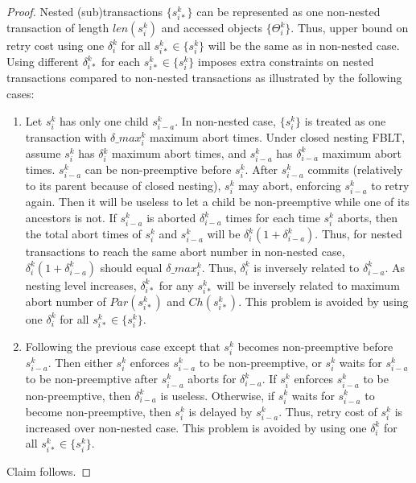 \documentclass[10pt, conference, compsocconf]{IEEEtran}
\begin{document}
\begin{proof}

Nested (sub)transactions $\{s_{i*}^{k}\}$ can be represented as one
non-nested transaction of length $len(s_{i}^{k})$ and accessed objects
$\{\Theta_{i}^{k}\}$. Thus, upper bound on retry cost using one $\delta_{i}^{k}$
for all $s_{i*}^{k}\in\{s_{i}^{k}\}$ will be the same as in non-nested
case. Using different $\delta_{i*}^{k}$ for each $s_{i*}^{k}\in\{s_{i}^{k}\}$
imposes extra constraints on nested transactions compared to non-nested
transactions as illustrated by the following cases:
\begin{enumerate}
\item Let $s_{i}^{k}$ has only one child $s_{i-a}^{k}$. In non-nested
case, $\{s_{i}^{k}\}$ is treated as one transaction with $\delta\_max_{i}^{k}$
maximum abort times. Under closed nesting FBLT, assume $s_{i}^{k}$
has $\delta{}_{i}^{k}$ maximum abort times, and $s_{i-a}^{k}$ has
$\delta_{i-a}^{k}$ maximum abort times. $s_{i-a}^{k}$ can be non-preemptive
before $s_{i}^{k}$. After $s_{i-a}^{k}$ commits (relatively to its
parent because of closed nesting), $s_{i}^{k}$ may abort, enforcing
$s_{i-a}^{k}$ to retry again. Then it will be useless to let a child
be non-preemptive while one of its ancestors is not. If $s_{i-a}^{k}$
is aborted $\delta_{i-a}^{k}$ times for each time $s_{i}^{k}$ aborts,
then the total abort times of $s_{i}^{k}$ and $s_{i-a}^{k}$ will
be $\delta_{i}^{k}\left(1+\delta_{i-a}^{k}\right)$. Thus, for nested
transactions to reach the same abort number in non-nested case, $\delta_{i}^{k}\left(1+\delta_{i-a}^{k}\right)$
should equal $\delta\_max_{i}^{k}$. Thus, $\delta_{i}^{k}$ is inversely
related to $\delta_{i-a}^{k}$. As nesting level increases, $\delta_{i*}^{k}$
for any $s_{i*}^{k}$ will be inversely related to maximum abort number
of $Par(s_{i*}^{k})$ and $Ch(s_{i*}^{k})$. This problem is avoided
by using one $\delta_{i}^{k}$ for all $s_{i*}^{k}\in\{s_{i}^{k}\}$.
\item Following the previous case except that $s_{i}^{k}$ becomes non-preemptive
before $s_{i-a}^{k}$. Then either $s_{i}^{k}$ enforces $s_{i-a}^{k}$
to be non-preemptive, or $s_{i}^{k}$ waits for $s_{i-a}^{k}$ to
be non-preemptive after $s_{i-a}^{k}$ aborts for $\delta_{i-a}^{k}$.
If $s_{i}^{k}$ enforces $s_{i-a}^{k}$ to be non-preemptive, then
$\delta_{i-a}^{k}$ is useless. Otherwise, if $s_{i}^{k}$ waits for
$s_{i-a}^{k}$ to become non-preemptive, then $s_{i}^{k}$ is delayed
by $s_{i-a}^{k}$. Thus, retry cost of $s_{i}^{k}$ is increased over
non-nested case. This problem is avoided by using one $\delta_{i}^{k}$
for all $s_{i*}^{k}\in\{s_{i}^{k}\}$.
\end{enumerate}
Claim follows.

\end{proof}
\end{document}

